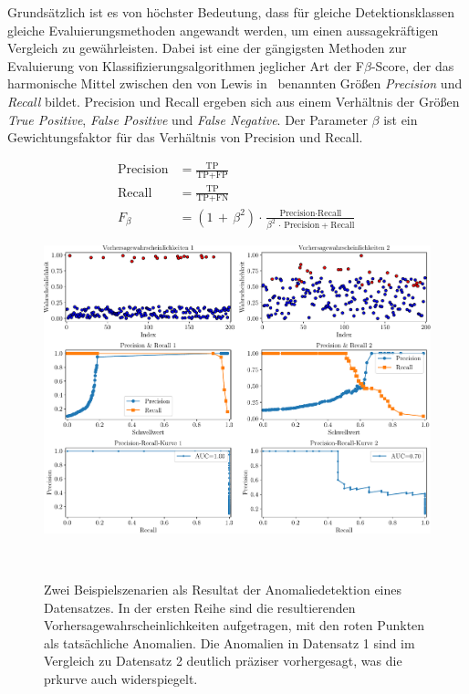 Grundsätzlich ist es von höchster Bedeutung, dass für gleiche Detektionsklassen gleiche Evaluierungsmethoden angewandt werden, um einen
aussagekräftigen Vergleich zu gewährleisten. Dabei ist eine der gängigsten Methoden zur Evaluierung von Klassifizierungsalgorithmen
jeglicher Art der F$\beta$-Score, der das harmonische Mittel zwischen den von Lewis in~\cite{Lewis1991} benannten Größen \textit{Precision}
und \textit{Recall} bildet. Precision und Recall ergeben sich aus einem Verhältnis der Größen \textit{True Positive}, \textit{False
Positive} und \textit{False Negative}. Der Parameter $\beta$ ist ein Gewichtungsfaktor für das Verhältnis von Precision und Recall.

\setlength{\jot}{15pt}
\begin{align}
    \text{Precision} &= \frac{\text{TP}}{\text{TP} + \text{FP}} \label{eq:precision} \\
    \text{Recall} &= \frac{\text{TP}}{\text{TP} + \text{FN}} \label{eq:recall} \\
    F_{\beta} &= (1\,+\,\beta^2) \cdot \frac{\text{Precision} \cdot \text{Recall}}{\beta^2\,\cdot\,\text{Precision} + \text{Recall}}
    \label{eq:fbeta}
\end{align}

\begin{figure}[b!]
    \centering
        \includegraphics[width=1\linewidth]{ch3_theorie_framework/abbildungen/pr-kurve.pdf}
    \caption{\centering Zwei Beispielszenarien als Resultat der Anomaliedetektion eines Datensatzes. In der ersten Reihe sind die resultierenden
    Vorhersagewahrscheinlichkeiten aufgetragen, mit den roten Punkten als tatsächliche Anomalien. Die Anomalien in Datensatz 1 sind im Vergleich
    zu Datensatz 2 deutlich präziser vorhergesagt, was die \ac{prkurve} auch widerspiegelt.}
~\label{fig:auc_pr_beispiel}
\end{figure}

